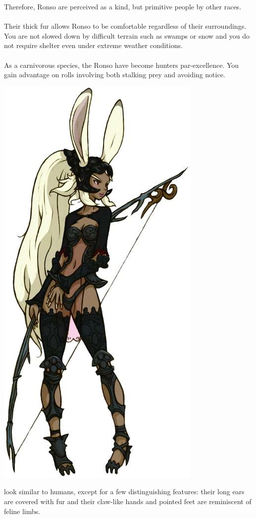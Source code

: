 Therefore, Ronso are perceived as a kind, but primitive people by other races. 
%
\\\\
%
 Their thick fur allows Ronso to be comfortable regardless of their surroundings.
You are not slowed down by difficult terrain such as swamps or snow and you do not require shelter even under extreme weather conditions.
%
\\\\
%
 As a carnivorous species, the Ronso have become hunters par-excellence. You gain advantage on rolls involving both stalking prey and avoiding notice.
%
\newpage
%
%
\begin{center} \includegraphics[width=0.58\columnwidth]{./art/races/viera.jpg} \end{center}
%
 look similar to humans, except for a few distinguishing features: 
their long ears are covered with fur and their claw-like hands and pointed feet are reminiscent of feline limbs.
